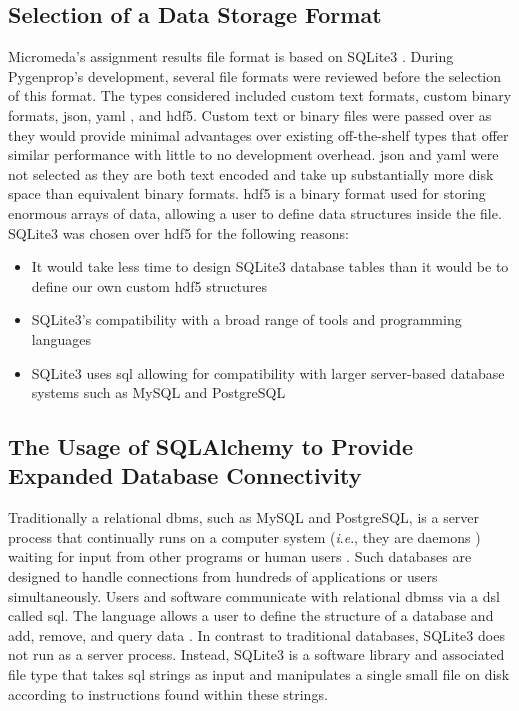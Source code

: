 \subsection{Selection of a Data Storage Format}

Micromeda's assignment results file format is based on SQLite3 
\cite{owens2006definitive}. During Pygenprop's development, several file formats 
were reviewed before the selection of this format. The types considered included 
custom text formats, custom binary formats, \gls{json}, \gls{yaml} 
\cite{ben2005yaml}, and \gls{hdf5}. Custom text or binary files were passed over 
as they would provide minimal advantages over existing off-the-shelf types that 
offer similar performance with little to no development overhead. \gls{json} and 
\gls{yaml} were not selected as they are both text encoded and take up 
substantially more disk space than equivalent binary formats. \gls{hdf5} 
\cite{folk2011overview} is a binary format used for storing enormous arrays of 
data, allowing a user to define data structures inside the file. SQLite3 was 
chosen over \gls{hdf5} for the following reasons:

\begin{itemize}
\item It would take less time to design SQLite3 database tables than it would be 
to define our own custom \gls{hdf5} structures
\item SQLite3's compatibility with a broad range of tools and programming 
languages
\item SQLite3 uses \gls{sql} \cite{sql1987guide} allowing for compatibility with 
larger server-based database systems such as MySQL \cite{dubois1999mysql} and 
PostgreSQL \cite{momjian2001postgresql, owens2006definitive}
\end{itemize}

\subsection{The Usage of SQLAlchemy to Provide Expanded Database Connectivity} 
\label{SQLAlchemy}

Traditionally a relational \gls{dbms}, such as MySQL and PostgreSQL, is a server 
process that continually runs on a computer system (\textit{i}.\textit{e}., they 
are daemons \cite{martin2006computer}) waiting for input from other programs or 
human users \cite{dubois1999mysql, momjian2001postgresql}. Such databases are 
designed to handle connections from hundreds of applications or users 
simultaneously. Users and software communicate with relational \gls{dbms}s via a 
\gls{dsl} called \gls{sql}. The language allows a user to define the structure 
of a database and add, remove, and query data \cite{sql1987guide}. In contrast 
to traditional databases, SQLite3 does not run as a server process. Instead, 
SQLite3 is a software library and associated file type that takes \gls{sql} 
strings as input and manipulates a single small file on disk 
\cite{owens2006definitive} according to instructions found within these strings.


